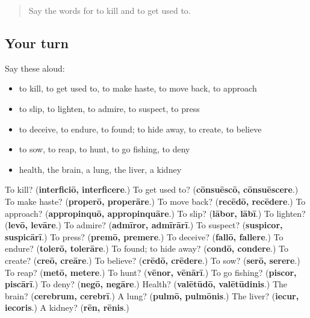 \label{lesson:LA-R173-second-pass-words-from-chapters-169-173}



\begin{quote}
Say the words for to kill and to get used to.
\end{quote}

\subsection*{Your turn}
Say these aloud:

\begin{itemize}
\raggedright
  \item to kill, to get used to, to make haste, to move back, to approach
  \item to slip, to lighten, to admire, to suspect, to press
  \item to deceive, to endure, to found; to hide away, to create, to believe
  \item to sow, to reap, to hunt, to go fishing, to deny
  \item health, the brain, a lung, the liver, a kidney
\end{itemize}

\begin{tcolorbox}[breakable,colback=teal!4,colframe=teal!35!black,title={Before you move on}]
To kill? (\textbf{interficiō, interficere}.) To get used to? (\textbf{cōnsuēscō, cōnsuēscere}.) To make haste? (\textbf{properō, properāre}.) To move back? (\textbf{recēdō, recēdere}.) To approach? (\textbf{appropinquō, appropinquāre}.) To slip? (\textbf{lābor, lābī}.) To lighten? (\textbf{levō, levāre}.) To admire? (\textbf{admīror, admīrārī}.) To suspect? (\textbf{suspicor, suspicārī}.) To press? (\textbf{premō, premere}.) To deceive? (\textbf{fallō, fallere}.) To endure? (\textbf{tolerō, tolerāre}.) To found; to hide away? (\textbf{condō, condere}.) To create? (\textbf{creō, creāre}.) To believe? (\textbf{crēdō, crēdere}.) To sow? (\textbf{serō, serere}.) To reap? (\textbf{metō, metere}.) To hunt? (\textbf{vēnor, vēnārī}.) To go fishing? (\textbf{piscor, piscārī}.) To deny? (\textbf{negō, negāre}.) Health? (\textbf{valētūdō, valētūdinis}.) The brain? (\textbf{cerebrum, cerebrī}.) A lung? (\textbf{pulmō, pulmōnis}.) The liver? (\textbf{iecur, iecoris}.) A kidney? (\textbf{rēn, rēnis}.)
\end{tcolorbox}

